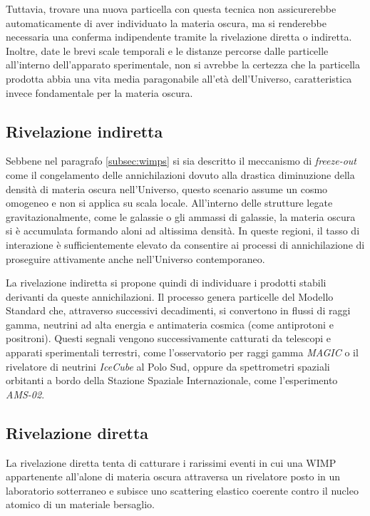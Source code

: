 Tuttavia, trovare una nuova particella con questa tecnica non assicurerebbe automaticamente di aver individuato la materia oscura, ma si renderebbe necessaria una conferma indipendente tramite la rivelazione diretta o indiretta. Inoltre, date le brevi scale temporali e le distanze percorse dalle particelle all'interno dell'apparato sperimentale, non si avrebbe la certezza che la particella prodotta abbia una vita media paragonabile all'età dell'Universo, caratteristica invece fondamentale per la materia oscura.

\subsection{Rivelazione indiretta}
\label{subsec:indiretta}

Sebbene nel paragrafo \ref{subsec:wimps} si sia descritto il meccanismo di \textit{freeze-out} come il congelamento delle annichilazioni dovuto alla drastica diminuzione della densità di materia oscura nell'Universo, questo scenario assume un cosmo  omogeneo e non si applica su scala locale. All'interno delle strutture legate gravitazionalmente, come le galassie o gli ammassi di galassie, la materia oscura si è accumulata formando aloni ad altissima densità. In queste regioni, il tasso di interazione è sufficientemente elevato da consentire ai processi di annichilazione di proseguire attivamente anche nell'Universo contemporaneo.

La rivelazione indiretta si propone quindi di individuare i prodotti stabili derivanti da queste annichilazioni. Il processo genera particelle del Modello Standard che, attraverso successivi decadimenti, si convertono in flussi di raggi gamma, neutrini ad alta energia e antimateria cosmica (come antiprotoni e positroni). Questi segnali vengono successivamente catturati da telescopi e apparati sperimentali terrestri, come l'osservatorio per raggi gamma \textit{MAGIC} o il rivelatore di neutrini \textit{IceCube} al Polo Sud, oppure da spettrometri spaziali orbitanti a bordo della Stazione Spaziale Internazionale, come l'esperimento \textit{AMS-02}.

\subsection{Rivelazione diretta}
\label{subsec:rivelazione_diretta}

La rivelazione diretta tenta di catturare i rarissimi eventi in cui una WIMP appartenente all'alone di materia oscura attraversa un rivelatore posto in un laboratorio sotterraneo e subisce uno scattering elastico coerente contro il nucleo atomico di un materiale bersaglio.


